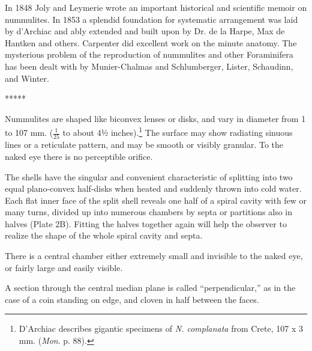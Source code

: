 \documentclass[a4paper, 12pt, oneside, landscape]{article}
\begin{document}
In 1848 Joly and Leymerie wrote an important historical and scientific memoir on nummulites. In 1853 a splendid foundation for systematic arrangement was laid by d'Archiac and ably extended and built upon by Dr. de la Harpe, Max de Hantken and others. Carpenter did excellent work on the minute anatomy. The mysterious problem of the reproduction of nummulites and other Foraminifera has been dealt with by Munier-Chalmas and Schlumberger, Lister, Schaudinn, and Winter.

\centerline{*\hspace{15mm}*\hspace{15mm}*\hspace{15mm}*\hspace{15mm}*}
\bigskip

Nummulites are shaped like biconvex lenses or disks, and vary in diameter from 1 to 107 mm. ($\frac{1}{25}$ to about 4½ inches).\footnote{D'Archiac describes gigantic specimens of \emph{N. complanata} from Crete, 107 x 3 mm. (\emph{Mon}. p. 88).} The surface may show radiating sinuous lines or a reticulate pattern, and may be smooth or visibly granular. To the naked eye there is no perceptible orifice.

The shells have the singular and convenient characteristic of splitting into two equal plano-convex half-disks when heated and suddenly thrown into cold water. Each flat inner face of the split shell reveals one half of a spiral cavity with few or many turns, divided up into numerous chambers by septa or partitions also in halves (Plate 2B). Fitting the halves together again will help the observer to realize the shape of the whole spiral cavity and septa.

There is a central chamber either extremely small and invisible to the naked eye, or fairly large and easily visible.

A section through the central median plane is called ``perpendicular,'' as in the case of a coin standing on edge, and cloven in half between the faces.
\end{document}
